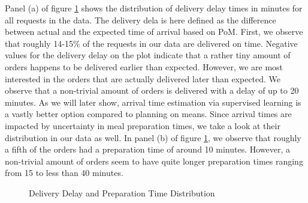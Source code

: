 Panel (a) of figure \ref{fig:prepdelay} shows the distribution of delivery delay times in minutes for all requests in the data. The delivery dela is here defined as the difference between actual and the expected time of arrival based on PoM. First, we observe that roughly 14-15\% of the requests in our data are delivered on time. Negative values for the delivery delay on the plot indicate that a rather tiny amount of orders happens to be delivered earlier than expected. However, we are most interested in the orders that are actually delivered later than expected. We observe that a non-trivial amount of orders is delivered with a delay of up to 20 minutes. As we will later show, arrival time estimation via supervised learning is a vastly better option compared to planning on means.
Since arrival times are impacted by uncertainty in meal preparation times, we take a look at their distribution in our data as well. In panel (b) of figure \ref{fig:prepdelay}, we observe that roughly a fifth of the orders had a preparation time of around 10 minutes. However, a non-trivial amount of orders seem to have quite longer preparation times ranging from 15 to less than 40 minutes. 
\begin{figure}[h]
	\centering
	\caption{Delivery Delay and Preparation Time Distribution}
	\label{fig:prepdelay}
\end{figure}

